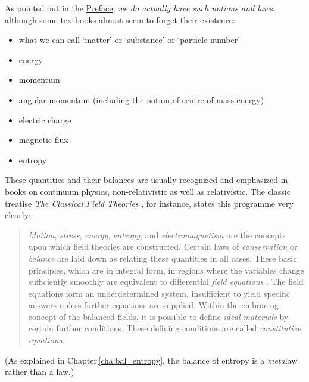 \documentclass[a4paper,12pt,%
onecolumn,oneside,%
british%
]{memoir}
\renewcommand*{\|}[1][]{\nonscript\:#1\vert\nonscript\:\mathopen{}}
\newcommand*{\chap}{Chapter}%
\newcommand*{\masse}{mass-energy}
\begin{document}
As pointed out in the \hyperref[cha:preface]{Preface}, \emph{we do actually have such notions and laws}, although some textbooks almost seem to forget their existence:
\begin{itemize}[nosep]
\item what we can call \enquote*{matter} or \enquote*{substance} or \enquote*{particle number}
\item energy
\item momentum
\item angular momentum (including the notion of centre of \masse)
\item electric charge
\item magnetic flux
\item entropy
\end{itemize}
These quantities and their balances are usually recognized and emphasized in books on continuum physics, non-relativistic as well as relativistic. The classic treatise \emph{The Classical Field Theories} \parencites*{truesdelletal1960}, for instance, states this programme very clearly:
\begin{quote}
  \emph{Motion}, \emph{stress}, \emph{energy}, \emph{entropy}, and \emph{electromagnetism} are the concepts upon which field theories are constructed. Certain laws of \emph{conservation} or \emph{balance} are laid down as relating these quantities in all cases. These basic principles, which are in integral form, in regions where the variables change sufficiently smoothly are equivalent to differential \emph{field equations} \textelp{}. The field equations \textelp{} form an underdetermined system, insufficient to yield specific answers unless further equations are supplied. Within the embracing concept of the balanced fields, it is possible to define \emph{ideal materials} by certain further conditions. These defining conditions are called \emph{constitutive equations}.
\end{quote}
(As explained in \chap\,\ref{cha:bal_entropy}, the balance of entropy is a \emph{meta}law rather than a law.)

\medskip
\end{document}
